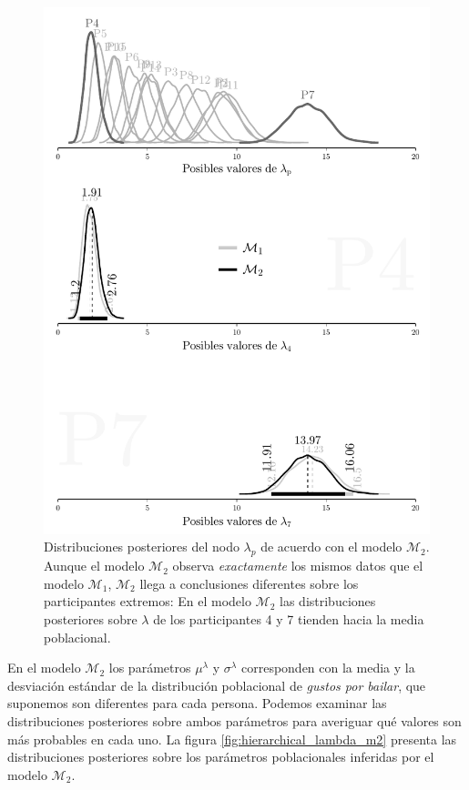 \documentclass{article}
\begin{document}
\begin{figure}[H]\centerline{\includegraphics[width=1\textwidth]{lambda_m2.pdf}}
\caption{Distribuciones posteriores del nodo $\lambda_p$ de acuerdo con el modelo $\mathcal M_2$. Aunque el modelo $\mathcal M_2$ observa \emph{exactamente} los mismos datos que el modelo $\mathcal M_1$, $\mathcal M_2$ llega a conclusiones diferentes sobre los participantes extremos: En el modelo $\mathcal M_2$ las distribuciones posteriores sobre $\lambda$ de los participantes 4 y 7 tienden hacia la media poblacional.}
\label{fig:lambda_m2}
\end{figure}

\indent En el modelo $\mathcal M_2$ los parámetros $\mu^\lambda$ y $\sigma^\lambda$ corresponden con la media y la desviación estándar de la distribución poblacional de \emph{gustos por bailar}, que suponemos son diferentes para cada persona. Podemos examinar las distribuciones posteriores sobre ambos parámetros para averiguar qué valores son más probables en cada uno. La figura \ref{fig:hierarchical_lambda_m2} presenta las distribuciones posteriores sobre los parámetros poblacionales inferidas por el modelo $\mathcal M_2$.
\end{document}
